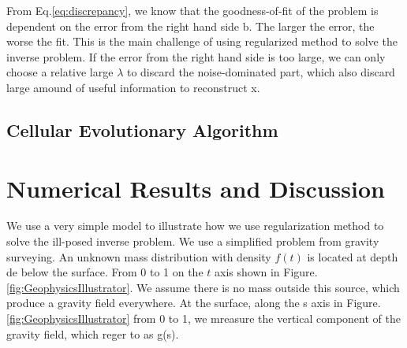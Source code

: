 \documentclass{article}
\begin{document}
From Eq.\ref{eq:discrepancy}, we know that the goodness-of-fit of the problem is
dependent on the error from the right hand side b. The larger the error, the
worse the fit. This is the main challenge of using regularized method to solve
the inverse problem. If the error from the right hand side is too large, we can
only choose a relative large \(\lambda \) to discard the noise-dominated part,
which also discard large amound of useful information to reconstruct x.


\subsection{Cellular Evolutionary Algorithm}
\section{Numerical Results and Discussion}
We use a very simple model to illustrate how we use regularization method to
solve the ill-posed inverse problem. We use a simplified problem from gravity
surveying. An unknown mass distribution with density \(f(t)\) is located at
depth de below the surface. From 0 to 1 on the \(t\) axis shown in
Figure. \ref{fig:GeophysicsIllustrator}. We assume there is no mass outside
this source, which produce a gravity field everywhere. At the surface, along the
s axis in Figure. \ref{fig:GeophysicsIllustrator} from 0 to 1, we mreasure the
vertical component of the gravity field, which reger to as g(s).
 
\end{document}
